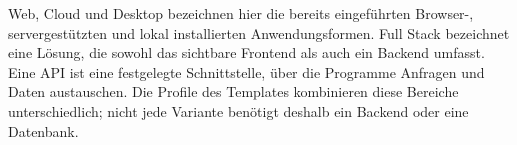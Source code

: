 \begin{beginnerstatement}

Web, Cloud und Desktop bezeichnen hier die bereits eingeführten
Browser-, servergestützten und lokal installierten Anwendungsformen. Full Stack
bezeichnet eine Lösung, die sowohl das sichtbare Frontend als auch ein Backend
umfasst. Eine API ist eine festgelegte
Schnittstelle, über die Programme Anfragen und Daten austauschen. Die Profile
des Templates kombinieren diese Bereiche unterschiedlich; nicht jede Variante
benötigt deshalb ein Backend oder eine Datenbank.

\end{beginnerstatement}
